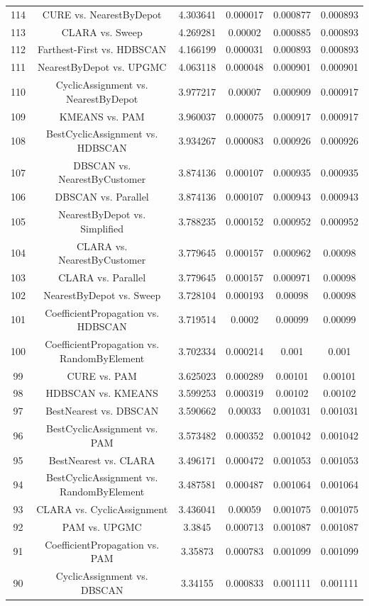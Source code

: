 \documentclass[a4paper,10pt]{article}
\begin{document}
\begin{landscape}
\begin{table}[!htp]
\begin{tabular}{cccccc}
114&CURE vs. NearestByDepot&4.303641&0.000017&0.000877&0.000893\\
113&CLARA vs. Sweep&4.269281&0.00002&0.000885&0.000893\\
112&Farthest-First vs. HDBSCAN&4.166199&0.000031&0.000893&0.000893\\
111&NearestByDepot vs. UPGMC&4.063118&0.000048&0.000901&0.000901\\
110&CyclicAssignment vs. NearestByDepot&3.977217&0.00007&0.000909&0.000917\\
109&KMEANS vs. PAM&3.960037&0.000075&0.000917&0.000917\\
108&BestCyclicAssignment vs. HDBSCAN&3.934267&0.000083&0.000926&0.000926\\
107&DBSCAN vs. NearestByCustomer&3.874136&0.000107&0.000935&0.000935\\
106&DBSCAN vs. Parallel&3.874136&0.000107&0.000943&0.000943\\
105&NearestByDepot vs. Simplified&3.788235&0.000152&0.000952&0.000952\\
104&CLARA vs. NearestByCustomer&3.779645&0.000157&0.000962&0.00098\\
103&CLARA vs. Parallel&3.779645&0.000157&0.000971&0.00098\\
102&NearestByDepot vs. Sweep&3.728104&0.000193&0.00098&0.00098\\
101&CoefficientPropagation vs. HDBSCAN&3.719514&0.0002&0.00099&0.00099\\
100&CoefficientPropagation vs. RandomByElement&3.702334&0.000214&0.001&0.001\\
99&CURE vs. PAM&3.625023&0.000289&0.00101&0.00101\\
98&HDBSCAN vs. KMEANS&3.599253&0.000319&0.00102&0.00102\\
97&BestNearest vs. DBSCAN&3.590662&0.00033&0.001031&0.001031\\
96&BestCyclicAssignment vs. PAM&3.573482&0.000352&0.001042&0.001042\\
95&BestNearest vs. CLARA&3.496171&0.000472&0.001053&0.001053\\
94&BestCyclicAssignment vs. RandomByElement&3.487581&0.000487&0.001064&0.001064\\
93&CLARA vs. CyclicAssignment&3.436041&0.00059&0.001075&0.001075\\
92&PAM vs. UPGMC&3.3845&0.000713&0.001087&0.001087\\
91&CoefficientPropagation vs. PAM&3.35873&0.000783&0.001099&0.001099\\
90&CyclicAssignment vs. DBSCAN&3.34155&0.000833&0.001111&0.001111\\

\end{tabular}
\end{table}
\end{landscape}
\end{document}
